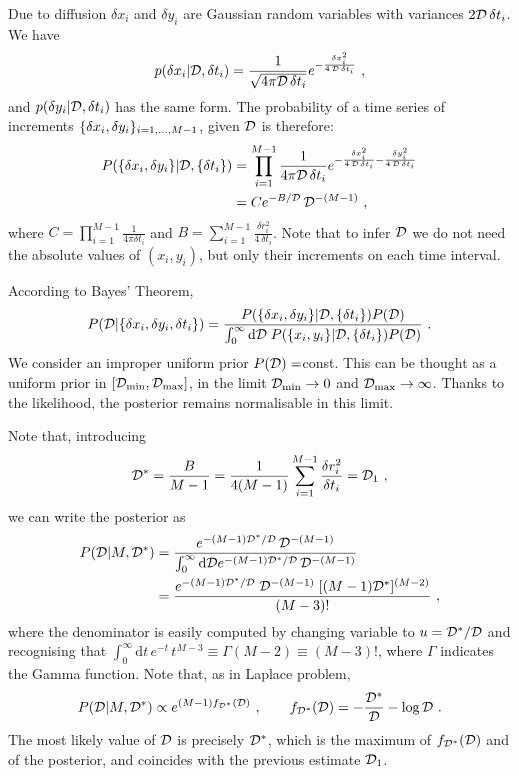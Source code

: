 \documentclass{article}
\def\DD{{\cal D}}
\newcommand{\beq}{\begin{equation}}
\newcommand{\eeq}{\end{equation}}
\def\de{\mathrm d}
\let\io=\infty
\begin{document}
 Due to diffusion $\delta x_i$ and $\delta y_i$ are Gaussian random variables with variances $2\DD \,\delta t_i$.   We have
\begin{equation}
p(\delta x_i|\DD,\d t_i)=\frac{1}{\sqrt {4\pi \DD\,\delta t_i} } e^ {-\frac{\delta x_i^2 }{ 4\,\DD\,\delta t_i}} \ ,
\end{equation}
and  $p(\delta y_i | \DD,\d t_i)$ has the same form.
 The probability of a time series of increments ${\{ \delta x_i, \delta y_i\}_{i=1,...,M-1}}$, given $\DD$ is therefore:
 \begin{equation}\begin{split}
P(\{ \d x_i, \d y_i\}|\DD, \{\d t_i \}) &= \prod_{i=1}^{M-1}\frac{1}{ {4\pi \DD\,\delta t_i} } e^ {-\frac{\delta x_i^2 }{ 4\,\DD\,\delta t_i}- \frac{\delta y_i^2 }{ 4\,\DD\,\delta t_i}} \\
&= C e^{-B/\DD} \, \DD^{-(M-1)} \ ,
\end{split}\end{equation}
where $C={\prod_{i=1}^{M-1}\frac 1 {4\pi\delta t_i} }$ and $B=\sum_{i=1}^{M-1} \frac{\delta r_i^2  }{ 4\,\delta t_i}$.
Note that to infer $\DD$ we do not need the absolute values of $(x_i, y_i)$, but only their increments on each time interval.

According to Bayes'  Theorem,
\begin{equation}
P(\DD|\{ \d x_i, \d y_i, \d t_i\})= \frac{P(\{ \d x_i, \d y_i\}|\DD,\{\d t_i\}) P(\DD)}{\int_0^{\infty}  \de \DD \;P(\{ x_i,y_i\}|\DD,\{\d t_i \}) P(\DD)} \ .
\end{equation}
We consider an improper uniform prior $P(\DD)=$const. This can be thought as a uniform prior in $[\DD_{\rm min}, \DD_{\rm max}]$, in the
limit $\DD_{\rm min}\to 0$ and $\DD_{\rm max}\to\io$. Thanks to the likelihood, the posterior remains normalisable in this limit.

Note that, introducing 
\beq
\DD^* = \frac{B}{M-1} = \frac {1}{4 (M-1)}\sum_{i=1}^{M-1} \frac{ \delta r_i^2}{\delta t_i}  = \DD_1 \ ,
\eeq
we can write the posterior as
\beq\begin{split}
\label{posterior}
P(\DD|M, \DD^*) &= \frac{e^{-(M-1) \DD^*/\DD} \, \DD^{-(M-1)}}{\int_0^{\infty}  \de \DD e^{-(M-1) \DD^*/\DD} \, \DD^{-(M-1)} } \\
 &=\frac{e^{-(M-1) \DD^*/\DD} \; \DD^{-(M-1)}\;[(M-1) \DD^*]^{(M-2)}}{(M-3)!} \ ,
\end{split}\eeq
where the denominator is easily computed by changing variable to $u = \DD^*/\DD$ and recognising that $ \int_0^{\infty} \de t  \, e^{-t} \,t^{M-3} \equiv \Gamma (M-2) \equiv (M-3)!$, where $\Gamma $ indicates the Gamma function.
Note that, as in Laplace problem,
\beq
P(\DD|M, \DD^*) \propto e^{(M-1) f_{\DD^*}(\DD)} \ , \qquad f_{\DD^*}(\DD) = - \frac{\DD^*}{\DD} - \log \DD \ .
\eeq
The most likely value of $\DD$ is precisely $\DD^*$, which is the maximum of $f_{\DD^*}(\DD)$ and of the posterior, and coincides with
the previous estimate $\DD_1$.
\end{document}
